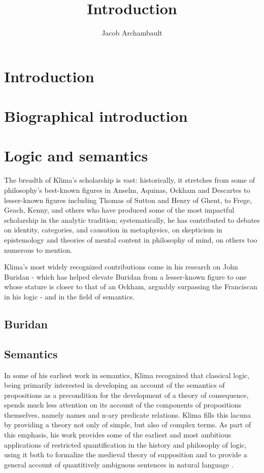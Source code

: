 \documentclass[]{article}
\title{Introduction}
\author{Jacob Archambault}
\begin{document}
\maketitle

\begin{abstract}

\end{abstract}

\section{Introduction}
\section{Biographical introduction}
\section{Logic and semantics}
The breadth of Klima's scholarship is vast: 
historically, it stretches from some of philosophy's best-known figures in Anselm, Aquinas, Ockham and Descartes 
to lesser-known figures including Thomas of Sutton and Henry of Ghent, 
to Frege, Geach, Kenny, and others who have produced some of the most impactful scholarship in the analytic tradition; 
systematically, he has contributed to debates on identity, categories, and causation in metaphysics, 
on skepticism in epistemology and theories of mental content in philosophy of mind, on others too numerous to mention.

Klima's most widely recognized contributions come in his research on John Buridan - which has helped elevate Buridan from a lesser-known figure to one whose stature is closer to that of an Ockham, arguably surpassing the Franciscan in his logic - and in the field of semantics. 
\subsection{Buridan}

\subsection{Semantics}
In some of his earliest work in semantics, 
Klima recognized that classical logic, 
being primarily interested in developing an account of the semantics of propositions as a precondition for the development of a theory of consequence, 
spends much less attention on its account of the components of propositions themselves, 
namely names and n-ary predicate relations. 
Klima fills this lacuna by providing a theory not only of simple, but also of complex terms. 
As part of this emphasis, 
his work provides some of the earliest and most ambitious applications of restricted quantification in the history and philosophy of logic, 
using it both to formalize the medieval theory of supposition and to provide a general account of quantitively ambiguous sentences in natural language \autocite{Klima1988,Klima1990,KlimaSandu1990,Klima1991b}. 
\end{document}
